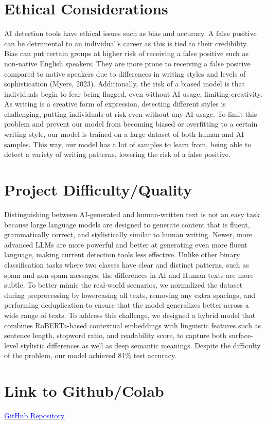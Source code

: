 \documentclass{article} %
\begin{document}
\section{Ethical Considerations}
AI detection tools have ethical issues such as bias and accuracy. A false positive can be detrimental to an individual’s career as this is tied to their credibility. Bias can put certain groups at higher risk of receiving a false positive such as non-native English speakers. They are more prone to receiving a false positive compared to native speakers due to differences in writing styles and levels of sophistication (Myers, 2023). Additionally, the risk of a biased model is that individuals begin to fear being flagged, even without AI usage, limiting creativity. As writing is a creative form of expression, detecting different styles is challenging, putting individuals at risk even without any AI usage.
To limit this problem and prevent our model from becoming biased or overfitting to a certain writing style, our model is trained on a large dataset of both human and AI samples. This way, our model has a lot of samples to learn from, being able to detect a variety of writing patterns, lowering the risk of a false positive. 


\section{Project Difficulty/Quality}
Distinguishing between AI-generated and human-written text is not an easy task because large language models are designed to generate content that is fluent, grammatically correct, and stylistically similar to human writing. Newer, more advanced LLMs are more powerful and better at generating even more fluent language, making current detection tools less effective. Unlike other binary classification tasks where two classes have clear and distinct patterns, such as spam and non-spam messages, the differences in AI and Human texts are more subtle. To better mimic the real-world scenarios, we normalized the dataset during preprocessing by lowercasing all texts, removing any extra spacings, and performing deduplication to ensure that the model generalizes better across a wide range of texts. To address this challenge, we designed a hybrid model that combines RoBERTa-based contextual embeddings with linguistic features such as sentence length, stopword ratio, and readability score, to capture both surface-level stylistic differences as well as deep semantic meanings. Despite the difficulty of the problem, our model achieved 81\% test accuracy. 


\hypersetup{
    colorlinks=true,
    linkcolor=blue,
    urlcolor=blue
}

\section{Link to Github/Colab}
\noindent
\href{https://github.com/shill7/APS360_Project}{\underline{\textcolor{blue}{GitHub Repository}}}

\label{last_page}



\end{document}
